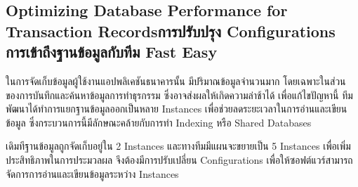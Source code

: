 \subsection{\ifenglish Optimizing Database Performance for Transaction Records\else การปรับปรุง Configurations การเข้าถึงฐานข้อมูลกับทีม Fast Easy\fi}
ในการจัดเก็บข้อมูลผู้ใช้งานแอปพลิเคชันธนาคารนั้น มีปริมาณข้อมูลจำนวนมาก โดยเฉพาะในส่วนของการบันทึกและค้นหาข้อมูลการทำธุรกรรม ซึ่งอาจส่งผลให้เกิดความล่าช้าได้ เพื่อแก้ไขปัญหานี้ ทีมพัฒนาได้ทำการแยกฐานข้อมูลออกเป็นหลาย Instances เพื่อช่วยลดระยะเวลาในการอ่านและเขียนข้อมูล ซึ่งกระบวนการนี้มีลักษณะคล้ายกับการทำ Indexing หรือ Shared Databases

เดิมทีฐานข้อมูลถูกจัดเก็บอยู่ใน 2 Instances และทางทีมมีแผนจะขยายเป็น 5 Instances เพื่อเพิ่มประสิทธิภาพในการประมวลผล จึงต้องมีการปรับเปลี่ยน Configurations เพื่อให้ซอฟต์แวร์สามารถจัดการการอ่านและเขียนข้อมูลระหว่าง Instances
